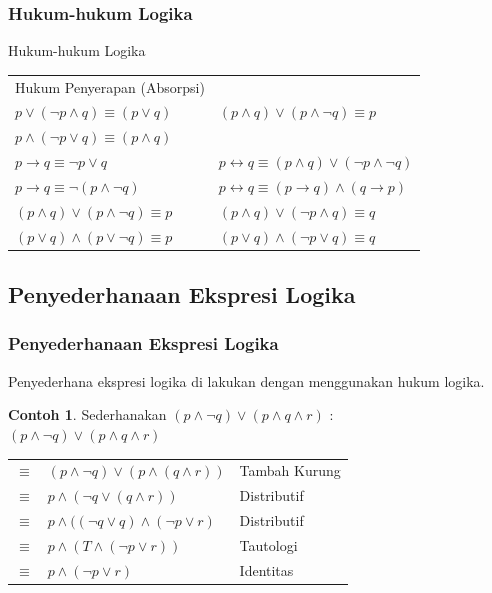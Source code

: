 \documentclass[handout]{beamer}
\theoremstyle{definition}
\theoremstyle{example}
\newtheorem{contoh}[theorem]{Contoh}
\begin{document}
\begin{frame}
	\frametitle{Hukum-hukum Logika}
	\begin{block}{Hukum-hukum Logika}
		\small	
		\begin{tabular}{ | l | l |}
			\hline
			Hukum Penyerapan (Absorpsi)  &   \\ 
			$p \vee (\neg p \wedge q) \equiv (p \vee q)$  & $(p \wedge q)\vee(p \wedge \neg q)\equiv p$  \\  
			$p \wedge (\neg p \vee q) \equiv (p \wedge q)$  &   \\ \hline
				
			$p \rightarrow q \equiv \neg p \vee q$  & $p \leftrightarrow q \equiv (p \wedge q) \vee (\neg p \wedge \neg q)$  \\  
			$p \rightarrow q \equiv \neg (p \wedge \neg q)$  &  $p \leftrightarrow q \equiv (p \rightarrow q) \wedge (q \rightarrow p)$ \\ \hline
				
			$(p \wedge q)\vee (p \wedge \neg q) \equiv p$  & $(p \wedge q)\vee (\neg p \wedge  q) \equiv q$  \\  
			$(p \vee q)\wedge (p \vee \neg q) \equiv p$& $(p \vee q)\wedge (\neg p \vee  q) \equiv q$ \\ \hline		
			
		\end{tabular}
	\end{block}
\end{frame}


\subsection{Penyederhanaan Ekspresi Logika}
\begin{frame}
	\frametitle{Penyederhanaan Ekspresi Logika}
	Penyederhana ekspresi logika di lakukan dengan menggunakan hukum logika.\\
	\begin{contoh}
		Sederhanakan $(p \wedge \neg q)\vee(p \wedge q \wedge r)$ :\\
		$(p \wedge \neg q)\vee(p \wedge q \wedge r)$\\		
		\begin{tabular}{ l l  l  }						
			$\equiv$ & $(p \wedge \neg q)\vee(p \wedge (q \wedge r))$ & Tambah Kurung   \\ 
			$\equiv$ & $p \wedge (\neg q \vee(q \wedge r))$ & Distributif   \\ 
			$\equiv$ & $p \wedge((\neg q \vee q)\wedge(\neg p \vee r)$ & Distributif \\ 
			$\equiv$ & $p \wedge(T \wedge (\neg p \vee r))$ & Tautologi  \\ 
			$\equiv$ & $p \wedge(\neg p \vee r)$ & Identitas   			
		\end{tabular}
	\end{contoh}	
\end{frame}
\end{document}
